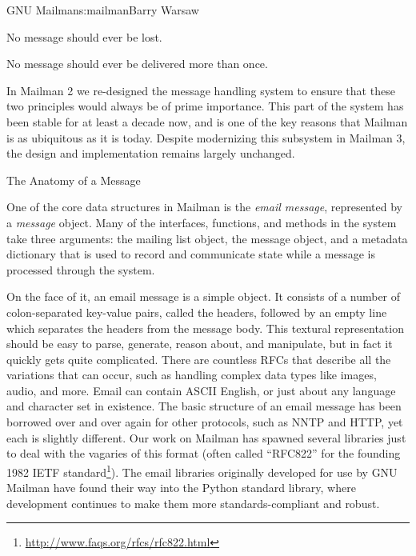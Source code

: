 \begin{aosachapter}{GNU Mailman}{s:mailman}{Barry Warsaw}
\begin{aosaitemize}

\item No message should ever be lost.

\item No message should ever be delivered more than once.

\end{aosaitemize}

In Mailman 2 we re-designed the message handling system to ensure that
these two principles would always be of prime importance.  This part
of the system has been stable for at least a decade now, and is one of
the key reasons that Mailman is as ubiquitous as it is today.  Despite
modernizing this subsystem in Mailman 3, the design and implementation
remains largely unchanged.

\begin{aosasect1}{The Anatomy of a Message}

One of the core data structures in Mailman is the \emph{email
  message}, represented by a \emph{message} object.  Many of the
interfaces, functions, and methods in the system take three arguments:
the mailing list object, the message object, and a metadata dictionary
that is used to record and communicate state while a message is
processed through the system.

On the face of it, an email message is a simple object.  It consists
of a number of colon-separated key-value pairs, called the headers,
followed by an empty line which separates the headers from the message
body.  This textural representation should be easy to parse, generate,
reason about, and manipulate, but in fact it quickly gets quite
complicated.  There are countless RFCs that describe all the
variations that can occur, such as handling complex data types like
images, audio, and more.  Email can contain ASCII English, or just
about any language and character set in existence.  The basic
structure of an email message has been borrowed over and over again
for other protocols, such as NNTP and HTTP, yet each is slightly
different.  Our work on Mailman has spawned several libraries just to
deal with the vagaries of this format (often called ``RFC822'' for the
founding 1982 IETF
standard\footnote{\url{http://www.faqs.org/rfcs/rfc822.html}}).  The
email libraries originally developed for use by GNU Mailman have found
their way into the Python standard library, where development
continues to make them more standards-compliant and robust.


\end{aosasect1}
\end{aosachapter}
